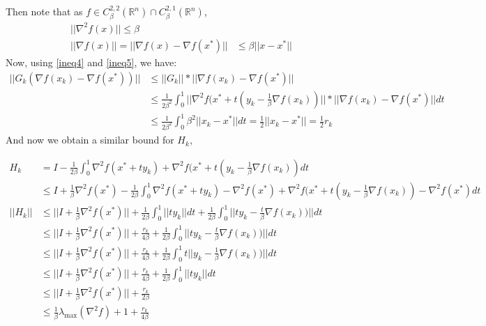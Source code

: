 Then note that as $f \in C_{\beta}^{2,2}( \mathbb{R}^n) \cap  C_{\beta}^{2,1}( \mathbb{R}^n) $,
\begin{align} \label{ineq4}
|| \nabla^2 f(x) || \leq \beta \\
|| \nabla f(x) || = || \nabla f(x) - \nabla f(x^*) ||& \leq  \beta || x - x^* ||  \label{ineq5}
\end{align}
Now, using \eqref{ineq4} and \eqref{ineq5}, we have:
\begin{equation}
\begin{aligned}
|| G_k ( \nabla f(x_k)  - \nabla f(x^*) ) || &\leq || G_k ||* ||  \nabla f(x_k)  - \nabla f(x^* )|| \\
& \leq  \frac{1}{2\beta^2} \int_0^1 || \nabla^2 f(x^* + t(y_k - \frac{1}{\beta} \nabla f(x_k)) || * ||  \nabla f(x_k)  - \nabla f(x^*) ||  dt \\
& \leq \frac{1}{2 \beta^2} \int_{0}^1 \beta^2 || x_k -  x^* || dt =\frac{1}{2} || x_k - x^* ||  = \frac{1}{2} r_k
\end{aligned}
\end{equation}
And now we obtain a similar bound for $H_k$,

\begin{equation}
\begin{aligned}
 H_k &= I -  \frac{1}{2\beta} \int_0^1 \nabla^2 f(x^* + ty_k) + \nabla^2 f(x^* + t(y_k - \frac{1}{\beta} \nabla f(x_k)) dt  \\
 & \leq I + \frac{1}{\beta} \nabla^2 f(x^*) - \frac{1}{2 \beta}   \int_0^1 \nabla^2 f(x^* + ty_k) -  \nabla^2 f(x^*) + \nabla^2 f(x^* + t(y_k - \frac{1}{\beta} \nabla f(x_k)) -  \nabla^2 f(x^*) dt \\
 ||H_k ||&  \leq || I + \frac{1}{\beta}\nabla^2 f(x^*) || + \frac{1}{2\beta} \int_0^1 || ty_k || dt  + \frac{1}{2\beta} \int_0^1 || t y_k - \frac{t}{\beta} \nabla f(x_k))  || dt \\
 & \leq  || I + \frac{1}{\beta}\nabla^2 f(x^*) || +  \frac{r_k}{4 \beta} + \frac{1}{2\beta} \int_0^1 || t y_k - \frac{t}{\beta} \nabla f(x_k))  || dt \\
 & \leq  || I + \frac{1}{\beta}\nabla^2 f(x^*) || +  \frac{r_k}{4 \beta} + \frac{1}{2\beta} \int_0^1 t || y_k - \frac{1}{\beta} \nabla f(x_k))  || dt \\
 & \leq  || I + \frac{1}{\beta}\nabla^2 f(x^*) || +  \frac{r_k}{4 \beta} + \frac{1}{2\beta} \int_0^1 || t y_k || dt   \\
 & \leq  || I + \frac{1}{\beta}\nabla^2 f(x^*) || +  \frac{r_k}{2 \beta} \\
 & \leq \frac{1}{\beta}  \lambda_{\max}(\nabla^2 f) + 1 + \frac{r_k}{4\beta}
\end{aligned}
\end{equation}


